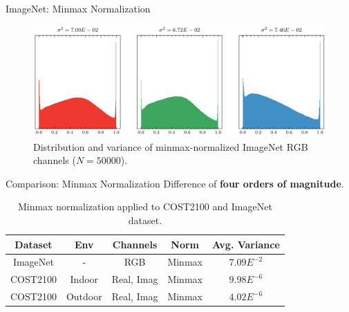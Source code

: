 \documentclass{beamer}
\begin{document}
  \begin{frame}{ImageNet: Minmax Normalization}
    \begin{figure}[htb]
      \centering
      \includegraphics[width=.9\textwidth]{imagenet_rgb_dist.pdf}
      \medskip
      \caption{Distribution and variance of minmax-normalized ImageNet RGB channels ($N=50000$).}
      \label{fig:imagenet_dist}
    \end{figure}
  \end{frame}

  \begin{frame}{Comparison: Minmax Normalization}
    Difference of \textbf{four orders of magnitude}.
    \footnotesize{
    \begin{table}[htb]
      \begin{center}
        \begin{tabular}{|c|c|c|c|c|}
        \hline
        \textbf{Dataset} & \textbf{Env} & \textbf{Channels} & \textbf{Norm} & \textbf{Avg. Variance} \\ \hline
        ImageNet         & -            & RGB                 & Minmax                 & \underline{$7.09E^{-2}$}       \\ \hline
        COST2100         & Indoor       & Real, Imag          & Minmax                 & \underline{$9.98E^{-6}$}       \\ \hline          
        COST2100         & Outdoor      & Real, Imag          & Minmax                 & \underline{$4.02E^{-6}$}       \\ \hline
        \end{tabular}
        \caption{Minmax normalization applied to COST2100 and ImageNet dataset.}
        \label{tab:minmax-compare} 
      \end{center}
    \end{table}
    }
  \end{frame}
\end{document}
